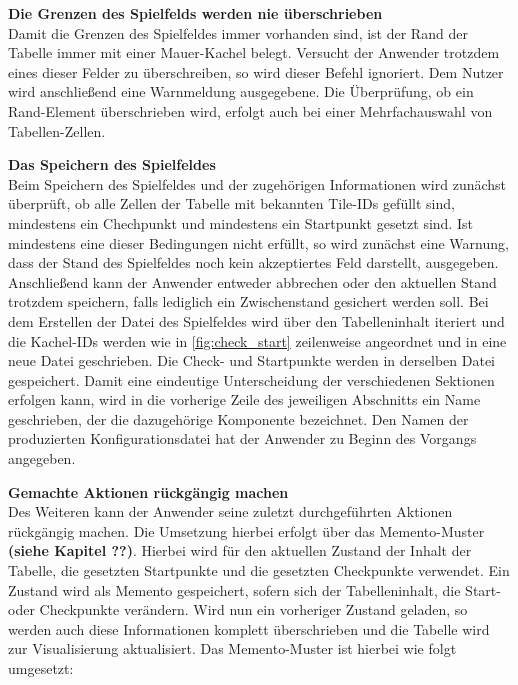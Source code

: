 \textbf{Die Grenzen des Spielfelds werden nie überschrieben}\\
Damit die Grenzen des Spielfeldes immer vorhanden sind, ist der Rand der Tabelle immer mit einer Mauer-Kachel belegt. Versucht der Anwender trotzdem eines dieser Felder zu überschreiben, so wird dieser Befehl ignoriert. Dem Nutzer wird anschließend eine Warnmeldung ausgegebene. Die Überprüfung, ob ein Rand-Element überschrieben wird, erfolgt auch bei einer Mehrfachauswahl von Tabellen-Zellen.

\textbf{Das Speichern des Spielfeldes}\\
Beim Speichern des Spielfeldes und der zugehörigen Informationen wird zunächst überprüft, ob alle Zellen der Tabelle mit bekannten Tile-IDs gefüllt sind, mindestens ein Chechpunkt und mindestens ein Startpunkt gesetzt sind. Ist mindestens eine dieser Bedingungen nicht erfüllt, so wird zunächst eine Warnung, dass der Stand des Spielfeldes noch kein akzeptiertes Feld darstellt, ausgegeben. Anschließend kann der Anwender entweder abbrechen oder den aktuellen Stand trotzdem speichern, falls lediglich ein Zwischenstand gesichert werden soll. Bei dem Erstellen der Datei des Spielfeldes wird über den Tabelleninhalt iteriert und die Kachel-IDs werden wie in \autoref{fig:check_start} zeilenweise angeordnet und in eine neue Datei geschrieben. Die Check- und Startpunkte werden in derselben Datei gespeichert. Damit eine eindeutige Unterscheidung der verschiedenen Sektionen erfolgen kann, wird in die vorherige Zeile des jeweiligen Abschnitts ein Name geschrieben, der die dazugehörige Komponente bezeichnet. Den Namen der produzierten Konfigurationsdatei hat der Anwender zu Beginn des Vorgangs angegeben.

\textbf{Gemachte Aktionen rückgängig machen}\\
Des Weiteren kann der Anwender seine zuletzt durchgeführten Aktionen rückgängig machen. Die Umsetzung hierbei erfolgt über das Memento-Muster \textbf{(siehe Kapitel ??)}. Hierbei wird für den aktuellen Zustand der Inhalt der Tabelle, die gesetzten Startpunkte und die gesetzten Checkpunkte verwendet. Ein Zustand wird als Memento gespeichert, sofern sich der Tabelleninhalt, die Start- oder Checkpunkte verändern. Wird nun ein vorheriger Zustand geladen, so werden auch diese Informationen komplett überschrieben und die Tabelle wird zur Visualisierung aktualisiert. Das Memento-Muster ist hierbei wie folgt umgesetzt:

